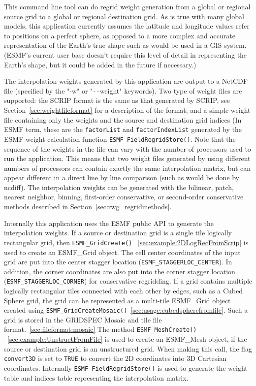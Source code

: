 This command line tool can do regrid weight generation from a global or regional source grid to a global or regional destination grid.
As is true with many global models, this application currently assumes the latitude and longitude values refer to positions on a perfect sphere, as opposed to a more complex and accurate representation of the Earth's true shape such as would be used in a GIS system. (ESMF's current user base doesn't require this level of detail in representing the Earth's shape, but it could be added in the future if necessary.)

The interpolation weights generated by this application are output to a NetCDF file (specified by the "-w" or "\verb+--+weight"
keywords). Two type of weight files are supported: the SCRIP format is the same as that generated by SCRIP, see Section~\ref{sec:weightfileformat} for a description of the format; and a simple weight file containing only the weights and the source and destination grid indices (In ESMF
term, these are the {\tt factorList} and {\tt factorIndexList} generated by the ESMF weight calculation function {\tt ESMF\_FieldRegridStore()}.
Note that the sequence of the weights in the file can
vary with the number of processors used to run the application. This means that two weight files generated by using different
numbers of processors can contain exactly the same interpolation matrix, but can appear different in a direct line by line
comparison (such as would be done by ncdiff). The interpolation weights can be generated with
the bilinear, patch, nearest neighbor, binning, first-order conservative, or second-order conservative methods described in Section~\ref{sec:rwg_regridmethods}.

        
Internally this application uses the ESMF public API to generate the interpolation weights.
If a source or destination grid is a single tile logically rectangular grid, then {\tt ESMF\_GridCreate()}
~\ref{sec:example:2DLogRecFromScrip}
is used to create an ESMF\_Grid object. The cell center
coordinates of the input grid are put into the center stagger location ({\tt ESMF\_STAGGERLOC\_CENTER}).
In addition, the corner coordinates are also put into the corner stagger location
({\tt ESMF\_STAGGERLOC\_CORNER}) for conservative regridding.  If a grid contains multiple logically rectangular tiles 
connected with each other by edges, such as a Cubed Sphere grid, the grid can be represented as a multi-tile ESMF\_Grid object created 
using {\tt ESMF\_GridCreateMosaic()}~\ref{sec:usage:cubedspherefromfile}. Such a grid is stored in the GRIDSPEC Mosaic and tile file format.~\ref{sec:fileformat:mosaic}
The method {\tt ESMF\_MeshCreate()} ~\ref{sec:example:UnstructFromFile}
is used to create an ESMF\_Mesh object, if the
source or destination grid is an unstructured grid. When making this call,
the flag {\tt convert3D} is set to {\tt TRUE} to convert the 2D coordinates into 3D Cartesian coordinates. 
Internally {\tt ESMF\_FieldRegridStore()} is used to generate the weight table and indices table representing the interpolation matrix.


